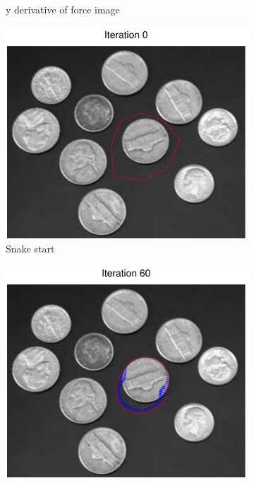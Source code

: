 \documentclass[11pt,a4paper]{article}
\begin{document}
\begin{figure}[H]
\begin{subfigure}[t]{0.24\textwidth}
        \caption{y derivative of force image}
        \label{fig:coins_fy}
    \end{subfigure}
    \begin{subfigure}[t]{0.24\textwidth}
        \includegraphics[width=\textwidth]{src/images/coins_gradient_0.pdf}
        \caption{Snake start}
        \label{fig:coins_0}
    \end{subfigure}
    \begin{subfigure}[t]{0.24\textwidth}
        \includegraphics[width=\textwidth]{src/images/coins_gradient_60.pdf}

\end{subfigure}
\end{figure}
\end{document}
